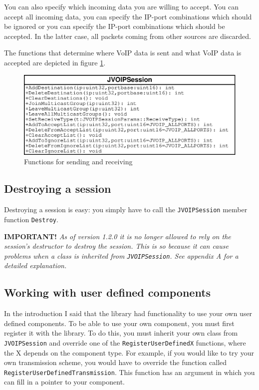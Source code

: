 		You can also specify which incoming data you are willing to accept. You
		can accept all incoming data, you can specify the IP-port combinations
		which should be ignored or you can specify the IP-port combinations which
		should be accepted. In the latter case, all packets coming from other
		sources are discarded.
		
		The functions that determine where VoIP data is sent and what VoIP data
		is accepted are depicted in figure \ref{send-and-receive-functions}.
		\begin{figure}
			\center
			\includegraphics[width=0.9\linewidth]{images/manual/chapter2/send-and-receive-functions.eps}
			\caption{Functions for sending and receiving}
			\label{send-and-receive-functions}
		\end{figure}
		
		\subsection{Destroying a session}
		
		Destroying a session is easy: you simply have to call the {\tt JVOIPSession}
		member function {\tt Destroy}. 

		{\bf IMPORTANT! }
		{\it As of version 1.2.0 it is no longer allowed to rely on the session's destructor
		to destroy the session. This is so because it can cause problems when a class is
		inherited from {\tt JVOIPSession}. See appendix A for a
		detailed explanation.}
		
		\subsection{Working with user defined components}
		
		In the introduction I said that the library had functionality to use your
		own user defined components. To be able to use your own component, you
		must first register it with the library. To do this, you must inherit
		your own class from {\tt JVOIPSession} and override one of the
		{\tt RegisterUserDefinedX} functions, where the X depends on the component
		type. For example, if you would like to try your own transmission scheme,
		you would have to override the function called
		{\tt RegisterUserDefinedTransmission}. This function has an argument in which
		you can fill in a pointer to your component.
		
